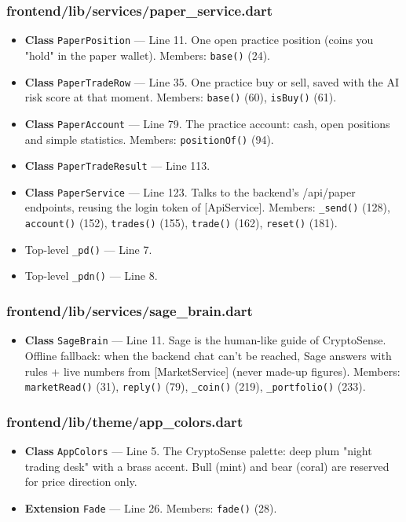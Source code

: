 \subsubsection*{frontend/lib/services/paper\_service.dart}
\begin{itemize}[nosep,leftmargin=1.5em]
\item \textbf{Class} \texttt{PaperPosition} --- Line 11. One open practice position (coins you "hold" in the paper wallet). Members: \texttt{base(\allowbreak{})} (24).
\item \textbf{Class} \texttt{PaperTradeRow} --- Line 35. One practice buy or sell, saved with the AI risk score at that moment. Members: \texttt{base(\allowbreak{})} (60), \texttt{isBuy(\allowbreak{})} (61).
\item \textbf{Class} \texttt{PaperAccount} --- Line 79. The practice account: cash, open positions and simple statistics. Members: \texttt{positionOf(\allowbreak{})} (94).
\item \textbf{Class} \texttt{PaperTradeResult} --- Line 113.
\item \textbf{Class} \texttt{PaperService} --- Line 123. Talks to the backend's /api/paper endpoints, reusing the login token of [ApiService]. Members: \texttt{\_\allowbreak{}send(\allowbreak{})} (128), \texttt{account(\allowbreak{})} (152), \texttt{trades(\allowbreak{})} (155), \texttt{trade(\allowbreak{})} (162), \texttt{reset(\allowbreak{})} (181).
\item Top-level \texttt{\_\allowbreak{}pd(\allowbreak{})} --- Line 7.
\item Top-level \texttt{\_\allowbreak{}pdn(\allowbreak{})} --- Line 8.
\end{itemize}
\subsubsection*{frontend/lib/services/sage\_brain.dart}
\begin{itemize}[nosep,leftmargin=1.5em]
\item \textbf{Class} \texttt{SageBrain} --- Line 11. Sage is the human-like guide of CryptoSense. Offline fallback: when the backend chat can't be reached, Sage answers with rules + live numbers from [MarketService] (never made-up figures). Members: \texttt{marketRead(\allowbreak{})} (31), \texttt{reply(\allowbreak{})} (79), \texttt{\_\allowbreak{}coin(\allowbreak{})} (219), \texttt{\_\allowbreak{}portfolio(\allowbreak{})} (233).
\end{itemize}
\subsubsection*{frontend/lib/theme/app\_colors.dart}
\begin{itemize}[nosep,leftmargin=1.5em]
\item \textbf{Class} \texttt{AppColors} --- Line 5. The CryptoSense palette: deep plum "night trading desk" with a brass accent. Bull (mint) and bear (coral) are reserved for price direction only.
\item \textbf{Extension} \texttt{Fade} --- Line 26. Members: \texttt{fade(\allowbreak{})} (28).
\end{itemize}
